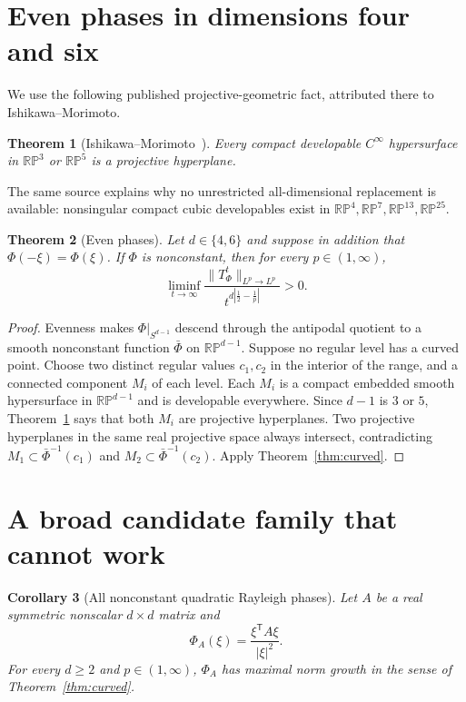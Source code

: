 \documentclass[11pt]{amsart}
\newtheorem{theorem}{Theorem}
\newtheorem{corollary}[theorem]{Corollary}
\theoremstyle{remark}
\newcommand{\RP}{\mathbb {RP}}
\begin{document}
\section{Even phases in dimensions four and six}

We use the following published projective-geometric fact, attributed there to
Ishikawa--Morimoto.

\begin{theorem}[Ishikawa--Morimoto~\cite{Ishikawa}]\label{thm:IM}
Every compact developable $C^\infty$ hypersurface in $\RP^3$ or $\RP^5$ is a
projective hyperplane.
\end{theorem}

The same source explains why no unrestricted all-dimensional replacement is
available: nonsingular compact cubic developables exist in
$\RP^4,\RP^7,\RP^{13},\RP^{25}$.

\begin{theorem}[Even phases]\label{thm:even}
Let $d\in\{4,6\}$ and suppose in addition that $\Phi(-\xi)=\Phi(\xi)$.  If
$\Phi$ is nonconstant, then for every $p\in(1,\infty)$,
\[
 \liminf_{t\to\infty}
 \frac{\|T_\Phi^t\|_{L^p\to L^p}}
 {t^{d|\frac12-\frac1p|}}>0.
\]
\end{theorem}

\begin{proof}
Evenness makes $\Phi|_{S^{d-1}}$ descend through the antipodal quotient to a
smooth nonconstant function $\bar\Phi$ on $\RP^{d-1}$.  Suppose no regular
level has a curved point.  Choose two distinct regular values $c_1,c_2$ in
the interior of the range, and a connected component $M_i$ of each level.
Each $M_i$ is a compact embedded smooth hypersurface in $\RP^{d-1}$ and is
developable everywhere.  Since $d-1$ is $3$ or $5$,
Theorem~\ref{thm:IM} says that both $M_i$ are projective hyperplanes.  Two
projective hyperplanes in the same real projective space always intersect,
contradicting $M_1\subset\bar\Phi^{-1}(c_1)$ and
$M_2\subset\bar\Phi^{-1}(c_2)$.  Apply Theorem~\ref{thm:curved}.
\end{proof}

\section{A broad candidate family that cannot work}

\begin{corollary}[All nonconstant quadratic Rayleigh phases]\label{cor:quad}
Let $A$ be a real symmetric nonscalar $d\times d$ matrix and
\[
 \Phi_A(\xi)=\frac{\xi^{\mathsf T}A\xi}{|\xi|^2}.
\]
For every $d\ge2$ and $p\in(1,\infty)$, $\Phi_A$ has maximal norm growth in
the sense of Theorem~\ref{thm:curved}.
\end{corollary}
\end{document}
